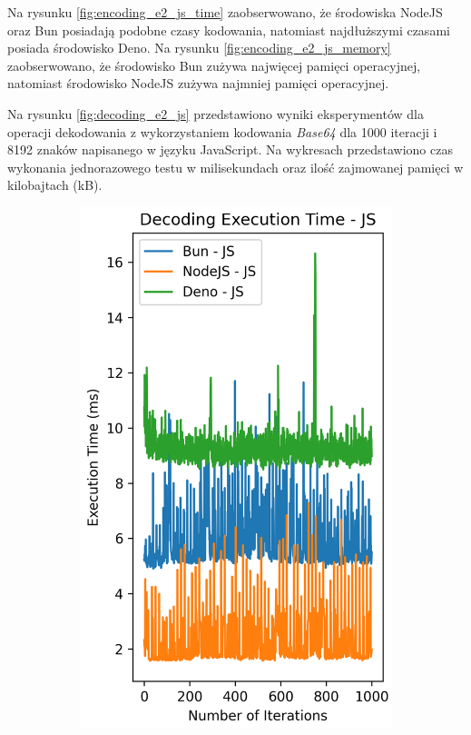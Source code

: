 Na rysunku \ref{fig:encoding_e2_js_time} zaobserwowano, że środowiska NodeJS oraz Bun posiadają podobne czasy kodowania, natomiast najdłuższymi czasami posiada środowisko Deno. Na rysunku \ref{fig:encoding_e2_js_memory} zaobserwowano, że środowisko Bun zużywa najwięcej pamięci operacyjnej, natomiast środowisko NodeJS zużywa najmniej pamięci operacyjnej.

Na rysunku \ref{fig:decoding_e2_js} przedstawiono wyniki eksperymentów dla operacji dekodowania z wykorzystaniem kodowania \textit{Base64} dla 1000 iteracji i 8192 znaków napisanego w języku JavaScript. Na wykresach przedstawiono czas wykonania jednorazowego testu w milisekundach oraz ilość zajmowanej pamięci w kilobajtach (kB).

\begin{figure}[H]
  \centering
  \begin{subfigure}[b]{0.42\textwidth}
    \centering
    \includegraphics[width=\textwidth]{Figures/coding/base64_1000_decoding_js_time.png}

\end{subfigure}
\end{figure}
